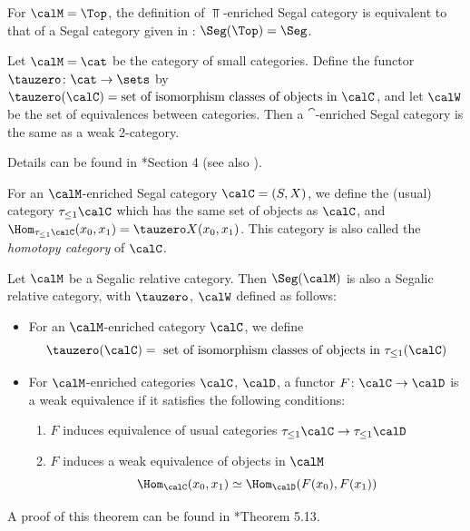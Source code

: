 \begin{example}\label{x:top-segal}
  For $\calM=\Top$, the definition of $\Top$-enriched Segal category is
  equivalent to that of a Segal category given in :
  $\Seg(\Top) = \Seg$.
\end{example}
\begin{example}\label{x:tamsamani-2cat}
  Let $\calM=\cat$ be the category of small categories. Define the functor
  $\tauzero\colon \cat\to \sets$ by $\tauzero(\calC)=\text{set of isomorphism
  classes of objects in }\calC$, and let $\calW$ be the set of equivalences
  between categories. Then a $\cat$-enriched Segal category is the same as a
  weak 2-category.

  Details can be found in *{Section 4} (see also
  ).
\end{example}
For an $\calM$-enriched Segal category $\calC=(S, X)$, we define the (usual)
category $\tau_{\leq 1}\calC$ which has the same set of objects as $\calC$, and
$\Hom_{\tau_{\leq 1} \calC}(x_0, x_1)=\tauzero X(x_0, x_1)$. This category
is also called the \emph{homotopy category} of $\calC$.

\begin{theorem}\label{t:segalic}
  Let $\calM$ be a Segalic relative category. Then $\Seg(\calM)$ is
  also a Segalic relative
  category, with $\tauzero$, $\calW$ defined as follows:
  \begin{itemize}
    \item For an $\calM$-enriched category $\calC$, we define
     $$
      \tauzero(\calC)=
      \text{ set of isomorphism classes of objects in }\tau_{\leq 1}(\calC)
     $$
    \item For $\calM$-enriched categories $\calC$, $\calD$, a functor
    $F \colon \calC\to \calD$ is a weak equivalence if it satisfies the
    following conditions:
    \begin{enumerate}
      \item $F$ induces equivalence of usual categories
        $\tau_{\leq 1}\calC \to \tau_{\leq 1}\calD$
      \item $F$ induces a weak equivalence of objects in $\calM$
        $$
        \Hom_{\calC}(x_0, x_1)\simeq \Hom_{\calD}(F(x_0), F(x_1))
        $$
    \end{enumerate}
  \end{itemize}
\end{theorem}

A proof of this theorem can be found in
 *{Theorem 5.13}.

